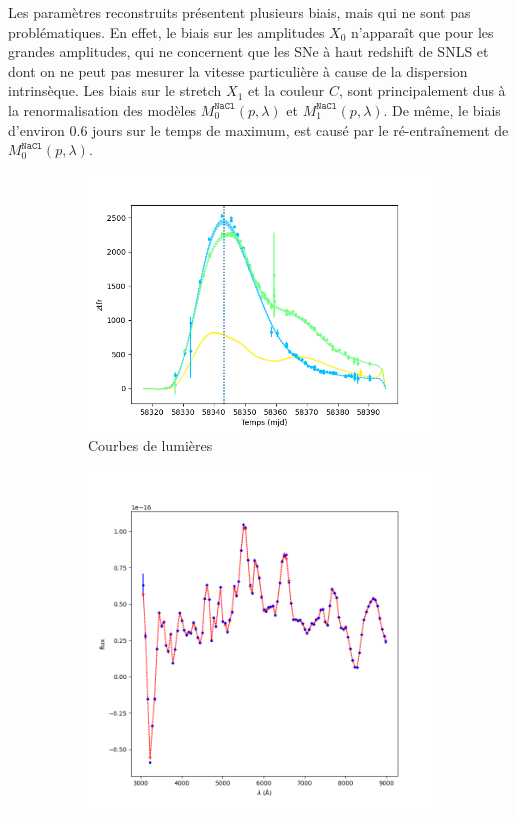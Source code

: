 \documentclass{book}
\def\nacl{\texttt{NaCl}\xspace}
\begin{document}
Les paramètres reconstruits présentent plusieurs biais, mais qui ne sont pas problématiques. En effet, le biais sur les amplitudes $X_0$ n'apparaît que pour les grandes amplitudes, qui ne concernent que les SNe à haut redshift de SNLS et dont on ne peut pas mesurer la vitesse particulière à cause de la dispersion intrinsèque. Les biais sur le stretch $X_1$ et la couleur $C$, sont principalement dus à la renormalisation des modèles $M_0^{\nacl}(p, \lambda)$ et $M_1^{\nacl}(p,\lambda)$. De même, le biais d'environ $0.6$ jours sur le temps de maximum, est causé par le ré-entraînement de $M_0^{\nacl}(p, \lambda)$.

\begin{figure}[h]
	\centering
	\begin{subfigure}{0.45\textwidth}
		\centering
		\includegraphics[width=\textwidth]{figures/nacl_lc.png}
		\caption{Courbes de lumières}
		\label{fig:nacl_lc}
	\end{subfigure}
	\hfill
	\begin{subfigure}{0.45\textwidth}
		\centering
		\includegraphics[width=\textwidth]{figures/nacl_spec.png}

\end{subfigure}
\end{figure}
\end{document}
